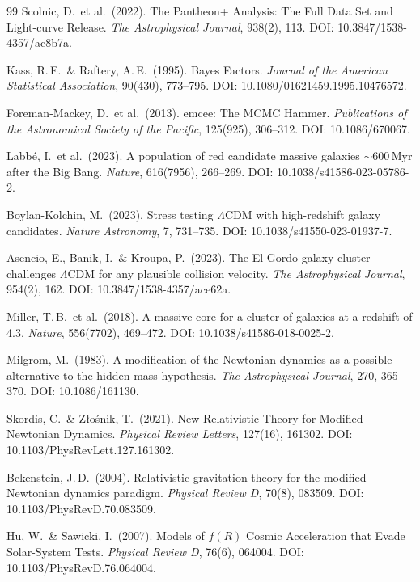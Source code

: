 \documentclass[aps,prd,twocolumn,superscriptaddress,nofootinbib]{revtex4-2}
\begin{document}
\begin{thebibliography}{99}
Scolnic, D.\ et al.\ (2022).
The Pantheon+ Analysis: The Full Data Set and Light-curve Release.
\textit{The Astrophysical Journal}, 938(2), 113.
DOI: 10.3847/1538-4357/ac8b7a.

Kass, R.\,E.\ \& Raftery, A.\,E.\ (1995).
Bayes Factors.
\textit{Journal of the American Statistical Association}, 90(430), 773--795.
DOI: 10.1080/01621459.1995.10476572.

Foreman-Mackey, D.\ et al.\ (2013).
emcee: The MCMC Hammer.
\textit{Publications of the Astronomical Society of the Pacific}, 125(925), 306--312.
DOI: 10.1086/670067.

Labb\'e, I.\ et al.\ (2023).
A population of red candidate massive galaxies $\sim$600\,Myr after the Big Bang.
\textit{Nature}, 616(7956), 266--269.
DOI: 10.1038/s41586-023-05786-2.

Boylan-Kolchin, M.\ (2023).
Stress testing $\Lambda$CDM with high-redshift galaxy candidates.
\textit{Nature Astronomy}, 7, 731--735.
DOI: 10.1038/s41550-023-01937-7.

Asencio, E., Banik, I.\ \& Kroupa, P.\ (2023).
The El Gordo galaxy cluster challenges $\Lambda$CDM for any plausible collision velocity.
\textit{The Astrophysical Journal}, 954(2), 162.
DOI: 10.3847/1538-4357/ace62a.

Miller, T.\,B.\ et al.\ (2018).
A massive core for a cluster of galaxies at a redshift of 4.3.
\textit{Nature}, 556(7702), 469--472.
DOI: 10.1038/s41586-018-0025-2.

Milgrom, M.\ (1983).
A modification of the Newtonian dynamics as a possible alternative to the hidden mass hypothesis.
\textit{The Astrophysical Journal}, 270, 365--370.
DOI: 10.1086/161130.

Skordis, C.\ \& Z{\l}o\'snik, T.\ (2021).
New Relativistic Theory for Modified Newtonian Dynamics.
\textit{Physical Review Letters}, 127(16), 161302.
DOI: 10.1103/PhysRevLett.127.161302.

Bekenstein, J.\,D.\ (2004).
Relativistic gravitation theory for the modified Newtonian dynamics paradigm.
\textit{Physical Review D}, 70(8), 083509.
DOI: 10.1103/PhysRevD.70.083509.

Hu, W.\ \& Sawicki, I.\ (2007).
Models of $f(R)$ Cosmic Acceleration that Evade Solar-System Tests.
\textit{Physical Review D}, 76(6), 064004.
DOI: 10.1103/PhysRevD.76.064004.


\end{thebibliography}
\end{document}

